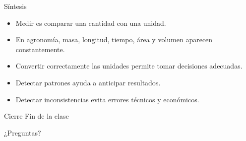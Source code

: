 \documentclass[handout,aspectratio=169,10pt]{beamer}
\begin{document}
	\begin{frame}{Síntesis}
		\begin{itemize}[<+->]
			\item Medir es comparar una cantidad con una unidad.
			\item En agronomía, masa, longitud, tiempo, área y volumen aparecen constantemente.
			\item Convertir correctamente las unidades permite tomar decisiones adecuadas.
			\item Detectar patrones ayuda a anticipar resultados.
			\item Detectar inconsistencias evita errores técnicos y económicos.
		\end{itemize}
	\end{frame}
	
	\begin{frame}{Cierre}
		\centering
		\vspace{1cm}
		{\Huge Fin de la clase}
		
		\vspace{0.6cm}
		{\Large ¿Preguntas?}
	\end{frame}
	
\end{document}
